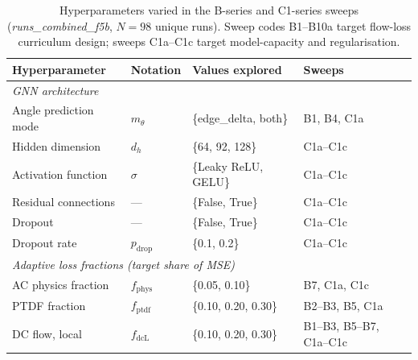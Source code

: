 

\begin{table}[htbp]
  \centering
  \caption{Hyperparameters varied in the B-series and C1-series sweeps
           (\textit{runs\_combined\_f5b}, $N=98$ unique runs).
           Sweep codes B1–B10a target flow-loss curriculum design;
           sweeps C1a–C1c target model-capacity and regularisation.}
  \label{tab:hparam_varied}
  \renewcommand{\arraystretch}{1.15}
  \begin{tabular}{llll}
    \toprule
    \textbf{Hyperparameter} & \textbf{Notation} & \textbf{Values explored} & \textbf{Sweeps} \\
    \midrule
    \multicolumn{4}{l}{\textit{GNN architecture}} \\[2pt]
    Angle prediction mode   & $m_\theta$    & \{edge\_delta, both\}         & B1, B4, C1a \\
    Hidden dimension        & $d_h$         & \{64, 92, 128\}               & C1a–C1c \\
    Activation function     & $\sigma$      & \{Leaky ReLU, GELU\}          & C1a–C1c \\
    Residual connections    & —             & \{False, True\}               & C1a–C1c \\
    Dropout                 & —             & \{False, True\}               & C1a–C1c \\
    Dropout rate            & $p_\text{drop}$ & \{0.1, 0.2\}               & C1a–C1c \\
    \midrule
    \multicolumn{4}{l}{\textit{Adaptive loss fractions (target share of MSE)}} \\[2pt]
    AC physics fraction     & $f_\text{phys}$    & \{0.05, 0.10\}           & B7, C1a, C1c \\
    PTDF fraction           & $f_\text{ptdf}$    & \{0.10, 0.20, 0.30\}     & B2–B3, B5, C1a \\
    DC flow, local          & $f_\text{dcL}$     & \{0.10, 0.20, 0.30\}     & B1–B3, B5–B7, C1a–C1c \\

\end{tabular}
\end{table}
